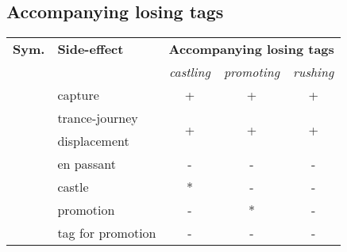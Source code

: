 \subsection*{Accompanying losing tags}
\label{sec:Appendix/Summary/Accompanying-losing-tags}

\begin{table}[!h]
\centering
\begin{tabular}{ rlccc }
\toprule %
\textbf{Sym.}               & \textbf{Side-effect}  & \multicolumn{3}{c}{ \textbf{Accompanying losing tags} }              \\
                                                    \cmidrule{3-5} %
                            &                       & \emph{castling}      & \emph{promoting}      & \emph{rushing}        \\
\midrule %
\alg{*}                     & capture               & +                    & +                     & +                     \\
\cmidrule{1-5} %
\multirow{2}{*}{\alg{<}}    & trance-journey        & \multirow{2}{*}{+}   & \multirow{2}{*}{+}    & \multirow{2}{*}{+}    \\
                            & displacement          &                      &                       &                       \\
\cmidrule{1-5} %
\alg{:}                     & en passant            & -                    & -                     & -                     \\
\alg{\&}                    & castle                & *                    & -                     & -                     \\
\alg{=}                     & promotion             & -                    & *                     & -                     \\
\alg{=}                     & tag for promotion     & -                    & -                     & -                     \\

\end{tabular}
\end{table}
